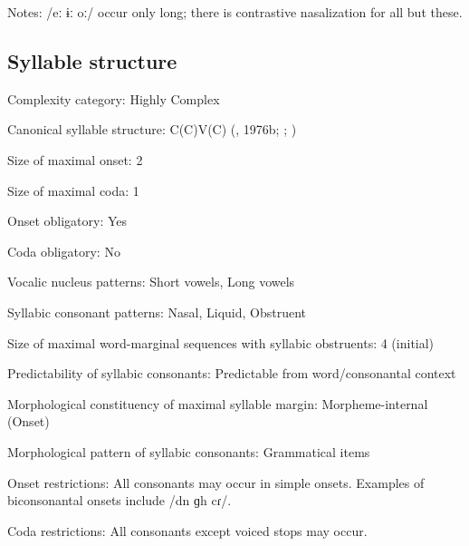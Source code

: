 {\begin{appendixdesc}
\item[Notes:] /eː ɨː oː/ occur only long; there is contrastive nasalization for all but these.
\end{appendixdesc}
\subsection*{Syllable structure}
\begin{appendixdesc}

\item[Complexity category:] Highly Complex 

\item[Canonical syllable structure:] C(C)V(C) (\citealt{Diffloth1976a}, 1976b; \citealt{Sloan1988}; \citealt{Philips2007})

\item[Size of maximal onset:] 2

\item[Size of maximal coda:] 1

\item[Onset obligatory:] Yes

\item[Coda obligatory:] No

\item[Vocalic nucleus patterns:] Short vowels, Long vowels

\item[Syllabic consonant patterns:] Nasal, Liquid, Obstruent

\item[Size of maximal word-marginal sequences with syllabic obstruents:] 4 (initial)

\item[Predictability of syllabic consonants:] Predictable from word/consonantal context

\item[Morphological constituency of maximal syllable margin:] Morpheme-internal (Onset)

\item[Morphological pattern of syllabic consonants:] Grammatical items

\item[Onset restrictions:] All consonants may occur in simple onsets. Examples of biconsonantal onsets include /dn ɡh cɾ/.

\item[Coda restrictions:] All consonants except voiced stops may occur.


\end{appendixdesc}}
